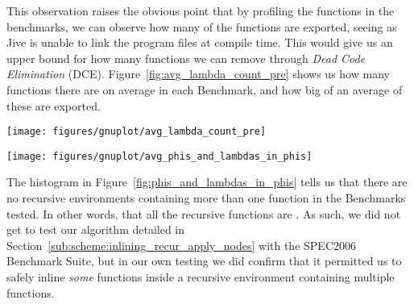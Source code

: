 This observation raises the obvious point that by profiling the functions in the
benchmarks, we can observe how many of the functions are exported, seeing as
Jive is unable to link the program files at compile time. This would give us an
upper bound for how many functions we can remove through \textit{Dead Code
Elimination} (DCE). Figure~\ref{fig:avg_lambda_count_pre} shows us how many functions
there are on average in each Benchmark, and how big of an average of these are
exported.

\begin{centering}
	\noindent\begin{minipage}{\textwidth}
		\captionsetup{type=figure}
		\hspace{-1em}
		\texttt{[image: figures/gnuplot/avg\_lambda\_count\_pre]}
	\end{minipage}
	\label{fig:avg_lambda_count_pre}
\end{centering}

\begin{centering}
	\noindent\begin{minipage}{\textwidth}
		\captionsetup{type=figure}
		\hspace{-1em}
		\texttt{[image: figures/gnuplot/avg\_phis\_and\_lambdas\_in\_phis]}
	\end{minipage}
	\label{fig:phis_and_lambdas_in_phis}
\end{centering}

The histogram in Figure~\ref{fig:phis_and_lambdas_in_phis} tells us that there
are no recursive environments containing more than one function in the
Benchmarks tested. In other words, that all the recursive functions are
. As such, we did not get to test our algorithm
detailed in Section~\ref{sub:scheme:inlining_recur_apply_nodes} with the
SPEC2006 Benchmark Suite, but in our own testing we did confirm that it
permitted us to safely inline \textit{some} functions inside a recursive
environment containing multiple functions.

